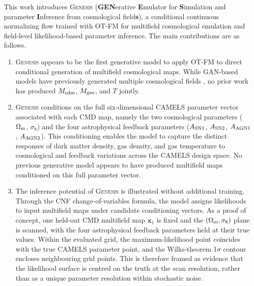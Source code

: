 \documentclass{article}
\newcommand{\Mcdm}{M_{\rm cdm}}
\newcommand{\Mgas}{M_{\rm gas}}
\newcommand{\Tgas}{T}
\newcommand{\Om}{\Omega_{\rm m}}
\newcommand{\sig}{\sigma_8}
\begin{document}
This work introduces \textsc{Genesis}
(\textbf{GEN}erative \textbf{E}mulator for
\textbf{S}imulation and parameter \textbf{I}nference from cosmological field\textbf{s}),
a conditional continuous normalizing flow trained with OT-FM for
multifield cosmological emulation and field-level likelihood-based
parameter inference. The main contributions are as follows.
\begin{enumerate}[label=\arabic*., leftmargin=*, labelsep=0.5em]
  \item \textsc{Genesis} appears to be the first
        generative model to apply OT-FM to direct conditional
        generation of multifield cosmological maps.
        While GAN-based models have previously generated multiple
        cosmological fields \citep{Andrianomena2022,Andrianomena2024},
        no prior work has produced $\Mcdm$,
        $\Mgas$, and $\Tgas$ jointly.

  \item \textsc{Genesis} conditions on the full six-dimensional
        CAMELS parameter vector associated with each CMD map, namely
        the two cosmological parameters ($\Om$, $\sig$) and the four
        astrophysical feedback parameters
        ($A_{\rm SN1}$, $A_{\rm SN2}$, $A_{\rm AGN1}$, $A_{\rm AGN2}$).
        This conditioning enables the model to capture the distinct
        responses of dark matter density, gas density, and gas
        temperature to cosmological and feedback variations across the
        CAMELS design space. No previous generative model appears to
        have produced multifield maps conditioned on this full
        parameter vector.

  \item The inference potential of \textsc{Genesis} is illustrated
        without additional training. Through the CNF change-of-variables
        formula, the model assigns likelihoods to input multifield maps
        under candidate conditioning vectors. As a proof of concept,
        one held-out CMD multifield map $\mathbf{x}_1$ is fixed and
        the $(\Om,\sig)$ plane is scanned, with the four astrophysical
        feedback parameters held at their true values. Within the evaluated
        grid, the maximum-likelihood point coincides with the true
        CAMELS parameter point, and the
        Wilks-theorem 1$\sigma$ contour encloses neighbouring grid
        points. This is therefore framed as evidence that the likelihood
        surface is centred on the truth at the scan resolution, rather
        than as a unique parameter resolution within stochastic noise.
\end{enumerate}
\end{document}
